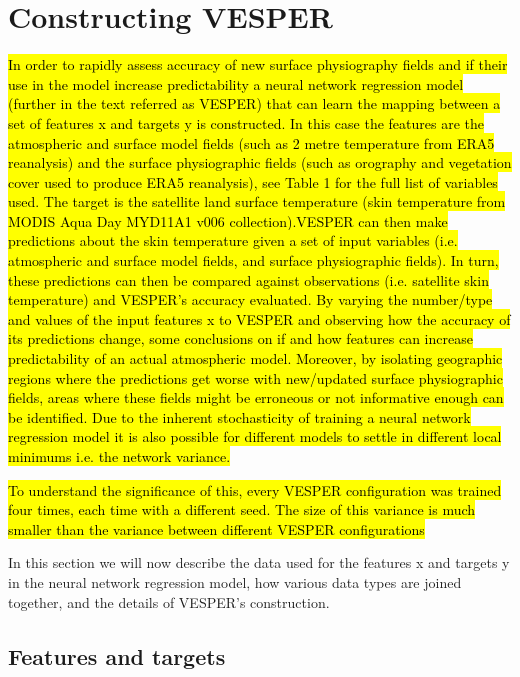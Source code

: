 \documentclass[hess, manuscript]{copernicus}
\begin{document}
\section{Constructing VESPER}\label{sec:2}
\hl{In order to rapidly assess accuracy of new surface physiography fields and if their use in the model increase predictability a neural network regression model (further in the text referred as VESPER) that can learn the mapping between a set of features x and targets y is constructed. In this case the features are the atmospheric and surface model fields (such as 2 metre temperature from ERA5 reanalysis) and the surface physiographic fields (such as orography and vegetation cover used to produce ERA5 reanalysis), see Table 1 for the full list of variables used. The target is the satellite land surface temperature (skin temperature from MODIS Aqua Day MYD11A1 v006 collection).VESPER can then make predictions about the skin temperature given a set of input variables (i.e. atmospheric and surface model fields, and surface physiographic fields). In turn, these predictions can then be compared against observations (i.e. satellite skin temperature) and VESPER's accuracy evaluated. By varying the number/type and values of the input features x to VESPER and observing how the accuracy of its predictions change, some conclusions on if and how features can increase predictability of an actual atmospheric model. Moreover, by isolating geographic regions where the predictions get worse with new/updated surface physiographic fields, areas where these fields might be erroneous or not informative enough can be identified. Due to the inherent stochasticity of training a neural network regression model it is also possible for different models to settle in different local minimums i.e. the network variance.}
	
	
	
	\hl{To understand the significance of this, every VESPER configuration was trained four times, each time with a different seed. The size of this variance is much smaller than the variance between different VESPER configurations}
	

		
		
		In this section we will now describe the data used for the features x and targets y in the neural network regression model, how various data types are joined together, and the details of VESPER’s construction.



\subsection{Features and targets}
\end{document}
